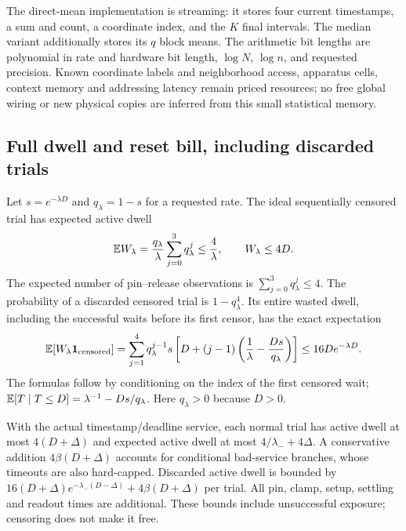 The direct-mean implementation is streaming: it stores four current
timestamps, a sum and count, a coordinate index, and the $K$ final
intervals. The median variant additionally stores its $q$ block means.
The arithmetic bit lengths are polynomial in rate and hardware bit
length, $\log N$, $\log n$, and requested precision. Known coordinate
labels and neighborhood access, apparatus cells, context memory and
addressing latency remain priced resources; no free global wiring or
new physical copies are inferred from this small statistical memory.

\subsection{Full dwell and reset bill, including discarded trials}
Let $s=e^{-\lambda D}$ and $q_\lambda=1-s$ for a requested rate.
The ideal sequentially censored trial has expected active dwell
\begin{equation}
 \mathbb E W_\lambda
 =\frac{q_\lambda}{\lambda}\sum_{j=0}^3q_\lambda^j
 \le\frac4\lambda,
 \qquad W_\lambda\le4D.
 \label{ra:dwell}
\end{equation}
The expected number of pin--release observations is
$\sum_{j=0}^3q_\lambda^j\le4$.
The probability of a discarded censored trial is $1-q_\lambda^4$.
Its entire wasted dwell, including the successful waits before its first
censor, has the exact expectation
\begin{equation}
 \mathbb E[W_\lambda\mathbf1_{\rm censored}]
 =\sum_{j=1}^4q_\lambda^{j-1}s
 \left[D+(j-1)\left(\frac1\lambda-
                  \frac{Ds}{q_\lambda}\right)\right]
 \le16D e^{-\lambda D}.
 \label{ra:waste}
\end{equation}
The formulas follow by conditioning on the index of the first censored
wait; $\mathbb E[T\mid T\le D]=\lambda^{-1}-Ds/q_\lambda$.
Here $q_\lambda>0$ because $D>0$.

With the actual timestamp/deadline service, each normal trial has active
dwell at most $4(D+\Delta)$ and expected active dwell at most
$4/\lambda_-+4\Delta$. A conservative addition
$4\beta(D+\Delta)$ accounts for conditional bad-service branches, whose
timeouts are also hard-capped. Discarded active dwell is bounded by
$16(D+\Delta)e^{-\lambda_-(D-\Delta)}+4\beta(D+\Delta)$ per trial.
All pin, clamp, setup, settling and readout times are additional. These
bounds include unsuccessful exposure; censoring does not make it free.

